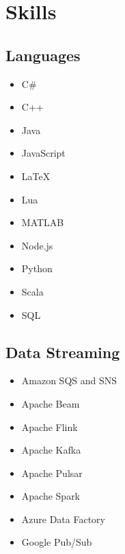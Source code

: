 \documentclass[letterpaper]{resume}
\begin{document}



\begin{minipage}[t]{0.27\columnwidth}


\section{Skills}

\subsection{Languages}
\begin{itemize}
\item C\#
\item C++
\item Java
\item JavaScript
\item \LaTeX
\item Lua
\item MATLAB
\item Node.js
\item Python
\item Scala
\item SQL
\end{itemize}

\sectionspace

\subsection{Data Streaming}
\begin{itemize}
\item Amazon SQS and SNS
\item Apache Beam
\item Apache Flink
\item Apache Kafka
\item Apache Pulsar
\item Apache Spark
\item Azure Data Factory
\item Google Pub/Sub
\end{itemize}


\end{minipage}
\end{document}
